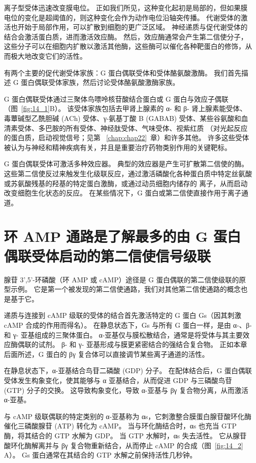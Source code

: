 离子型受体迅速改变膜电位。
正如我们所见，这种变化起初是局部的，但如果膜电位的变化是超阈值的，则这种变化会作为动作电位沿轴突传播。
代谢受体的激活也开始于局部作用，可以扩散到细胞的更广泛区域。
神经递质与促代谢受体的结合会激活蛋白质，进而激活效应酶。
然后，效应酶通常会产生第二信使分子，这些分子可以在细胞内扩散以激活其他酶，这些酶可以催化各种靶蛋白的修饰，从而极大地改变它们的活性。


有两个主要的促代谢受体家族：G 蛋白偶联受体和受体酪氨酸激酶。
我们首先描述 G 蛋白偶联受体家族，然后讨论受体酪氨酸激酶家族。


G 蛋白偶联受体通过三聚体鸟嘌呤核苷酸结合蛋白或 G 蛋白与效应子偶联（图~\ref{fig:14_1}B）。
该受体家族包括去甲肾上腺素的 α- 和 β- 肾上腺素能受体、毒蕈碱型乙酰胆碱 (ACh) 受体、γ-氨基丁酸 B (GABAB) 受体、某些谷氨酸和血清素受体、多巴胺的所有受体、神经肽受体、气味受体、视紫红质 （对光起反应的蛋白质，启动视觉信号；见第 ~\ref{chap:chap22}~章）和许多其他。
许多这些受体被认为与神经和精神疾病有关，并且是重要治疗药物类别作用的关键靶标。


G 蛋白偶联受体可激活多种效应器。
典型的效应器是产生可扩散第二信使的酶。
这些第二信使反过来触发生化级联反应，通过激活磷酸化各种蛋白质中特定丝氨酸或苏氨酸残基的羟基的特定蛋白激酶，或通过动员细胞内储存的  离子，从而启动改变细胞生化状态的反应。
在某些情况下，G 蛋白或第二信使直接作用于离子通道。



\section{环 AMP 通路是了解最多的由 G 蛋白偶联受体启动的第二信使信号级联}

腺苷 3',5'-环磷酸（环 AMP 或 cAMP）途径是 G 蛋白偶联的第二信使级联的原型示例。
它是第一个被发现的第二信使通路，我们对其他第二信使通路的概念也是基于它。


递质与连接到 cAMP 级联的受体的结合首先激活特定的 G 蛋白 Gs（因其刺激 cAMP 合成的作用而得名）。
在静息状态下，Gs 与所有 G 蛋白一样，是由 α-、β- 和 γ- 亚基组成的三聚体蛋白。
α-亚基仅与膜松散结合，通常是将受体与其主要效应酶偶联的试剂。
β- 和 γ- 亚基形成与膜更紧密结合的强结合复合物。
正如本章后面所述，G 蛋白的 βγ 复合体可以直接调节某些离子通道的活性。


在静息状态下，α-亚基结合鸟苷二磷酸 (GDP) 分子。
在配体结合后，G 蛋白偶联受体发生构象变化，使其能够与 α 亚基结合，从而促进 GDP 与三磷酸鸟苷 (GTP) 分子的交换。
这导致构象变化，导致 α-亚基与 βγ 复合物分离，从而激活 α-亚基。


与 cAMP 级联偶联的特定类别的 α-亚基称为 αs，它刺激整合膜蛋白腺苷酸环化酶催化三磷酸腺苷 (ATP) 转化为 cAMP。
当与环化酶结合时，αs 也充当 GTP 酶，将其结合的 GTP 水解为 GDP。
当 GTP 水解时，αs 失去活性。 它从腺苷酸环化酶解离并与 βγ 复合物重新结合，从而停止 cAMP 的合成（图~\ref{fig:14_2} A）。
Gs 蛋白通常在其结合的 GTP 水解之前保持活性几秒钟。


